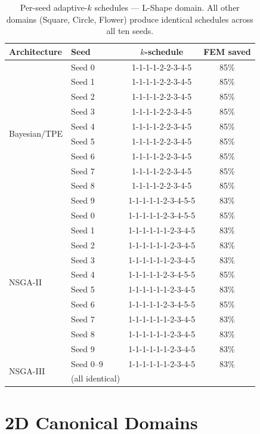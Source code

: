 \begin{table}[H]
\centering\small\setlength{\tabcolsep}{4pt}
\caption{Per-seed adaptive-$k$ schedules --- L-Shape domain.
All other domains (Square, Circle, Flower) produce identical schedules across
all ten seeds.}
\label{tab:lshape_k_schedules}
\begin{tabular}{@{}llcc@{}}
\toprule
Architecture & Seed & $k$-schedule & FEM saved \\
\midrule
\multirow{10}{*}{Bayesian/TPE}
  & Seed 0 & 1-1-1-1-2-2-3-4-5 & 85\% \\
  & Seed 1 & 1-1-1-1-2-2-3-4-5 & 85\% \\
  & Seed 2 & 1-1-1-1-2-2-3-4-5 & 85\% \\
  & Seed 3 & 1-1-1-1-2-2-3-4-5 & 85\% \\
  & Seed 4 & 1-1-1-1-2-2-3-4-5 & 85\% \\
  & Seed 5 & 1-1-1-1-2-2-3-4-5 & 85\% \\
  & Seed 6 & 1-1-1-1-2-2-3-4-5 & 85\% \\
  & Seed 7 & 1-1-1-1-2-2-3-4-5 & 85\% \\
  & Seed 8 & 1-1-1-1-2-2-3-4-5 & 85\% \\
  & Seed 9 & 1-1-1-1-1-2-3-4-5-5 & 83\% \\
\midrule
\multirow{10}{*}{NSGA-II}
  & Seed 0 & 1-1-1-1-1-2-3-4-5-5 & 85\% \\
  & Seed 1 & 1-1-1-1-1-1-2-3-4-5 & 83\% \\
  & Seed 2 & 1-1-1-1-1-1-2-3-4-5 & 83\% \\
  & Seed 3 & 1-1-1-1-1-1-2-3-4-5 & 83\% \\
  & Seed 4 & 1-1-1-1-1-2-3-4-5-5 & 85\% \\
  & Seed 5 & 1-1-1-1-1-1-2-3-4-5 & 83\% \\
  & Seed 6 & 1-1-1-1-1-2-3-4-5-5 & 85\% \\
  & Seed 7 & 1-1-1-1-1-1-2-3-4-5 & 83\% \\
  & Seed 8 & 1-1-1-1-1-1-2-3-4-5 & 83\% \\
  & Seed 9 & 1-1-1-1-1-1-2-3-4-5 & 83\% \\
\midrule
\multirow{2}{*}{NSGA-III}
  & Seed 0--9 & 1-1-1-1-1-1-2-3-4-5 & 83\% \\
  & (all identical) & & \\
\bottomrule
\end{tabular}
\end{table}

\section*{2D Canonical Domains}

